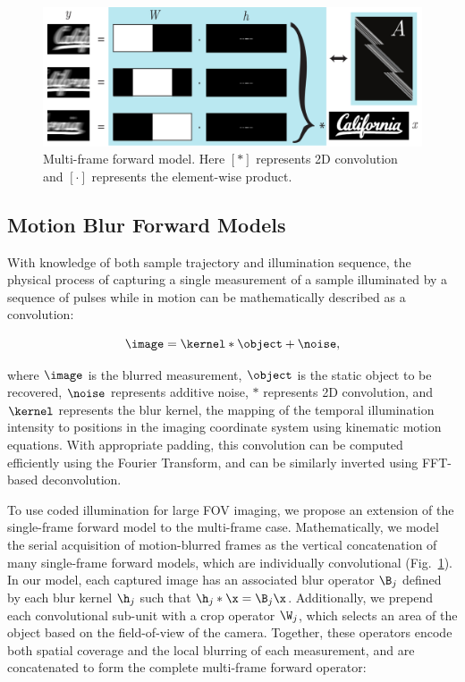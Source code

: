\begin{figure}
  \centering
    \includegraphics[width=\textwidth]{figures/fig_highthroughput_forward_model.pdf}
  \caption{\label{fig:forward_model}Multi-frame forward model. Here $[*]$ represents 2D convolution and $[\cdot]$ represents the element-wise product.}
\end{figure}

\subsection{Motion Blur Forward Models}
With knowledge of both sample trajectory and illumination sequence, the physical process of capturing a single measurement of a sample illuminated by a sequence of pulses while in motion can be mathematically described as a convolution:

\begin{equation}
\label{eq:single_forward}
\image = \kernel * \object + \noise,
\end{equation}

\noindent where $\image$ is the blurred measurement, $\object$ is the static object to be recovered, $\noise$ represents additive noise, $*$ represents 2D convolution, and $\kernel$ represents the blur kernel, the mapping of the temporal illumination intensity to positions in the imaging coordinate system using kinematic motion equations. With appropriate padding, this convolution can be computed efficiently using the Fourier Transform, and can be similarly inverted using FFT-based deconvolution.

To use coded illumination for large FOV imaging, we propose an extension of the single-frame forward model to the multi-frame case.
Mathematically, we model the serial acquisition of motion-blurred frames as the vertical concatenation of many single-frame forward models, which are individually convolutional (Fig.~\ref{fig:forward_model}).
In our model, each captured image has an associated blur operator $\B_j$ defined by each blur kernel $\h_j$ such that $\h_j * \x = \B_j \x$.
Additionally, we prepend each convolutional sub-unit with a crop operator $\W_j$, which selects an area of the object based on the field-of-view of the camera. Together, these operators encode both spatial coverage and the local blurring of each measurement, and are concatenated to form the complete multi-frame forward operator:

